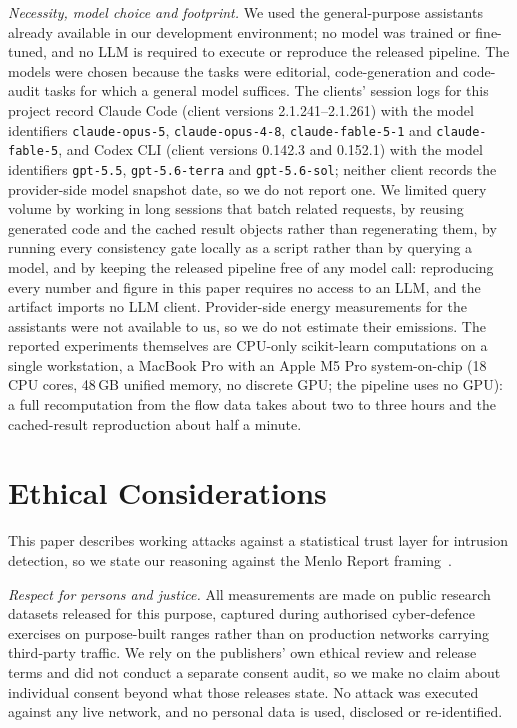 \documentclass[conference]{IEEEtran}
\begin{document}
\emph{Necessity, model choice and footprint.} We used the general-purpose assistants already available
in our development environment; no model was trained or fine-tuned, and no LLM is required to execute or
reproduce the released pipeline. The models were chosen because the tasks were editorial, code-generation and code-audit tasks for
which a general model suffices. The clients' session logs for this project record Claude Code (client versions 2.1.241--2.1.261) with the model identifiers \texttt{claude-opus-5}, \texttt{claude-opus-4-8},
\texttt{claude-fable-5-1} and \texttt{claude-fable-5}, and Codex CLI (client versions 0.142.3 and
0.152.1) with the model identifiers \texttt{gpt-5.5}, \texttt{gpt-5.6-terra} and \texttt{gpt-5.6-sol};
neither client records the provider-side model snapshot date, so we do not report one. We limited query
volume by working in long sessions
that batch related requests, by reusing generated code and the cached result objects rather than
regenerating them, by running every consistency gate locally as a script rather than by querying a model,
and by keeping the released pipeline free of any model call: reproducing every number and figure in this
paper requires no access to an LLM, and the artifact imports no LLM client. Provider-side energy
measurements for the assistants were not available to us, so we do not estimate their emissions. The
reported experiments themselves are CPU-only scikit-learn computations on a single workstation, a
MacBook Pro with an Apple M5 Pro system-on-chip (18 CPU cores, 48\,GB unified memory, no discrete GPU;
the pipeline uses no GPU): a full recomputation from the flow data takes about two to three hours and
the cached-result reproduction about half a minute.

\section*{Ethical Considerations}

This paper describes working attacks against a statistical trust layer for intrusion detection, so we
state our reasoning against the Menlo Report framing~\cite{menlo2012}.

\emph{Respect for persons and justice.} All measurements are made on public research datasets released
for this purpose, captured during authorised cyber-defence exercises on purpose-built ranges rather than
on production networks carrying third-party traffic. We rely on the publishers' own ethical review and
release terms and did not conduct a separate consent audit, so we make no claim about individual consent
beyond what those releases state. No attack was executed against any live network, and no personal data
is used, disclosed or re-identified.
\end{document}
